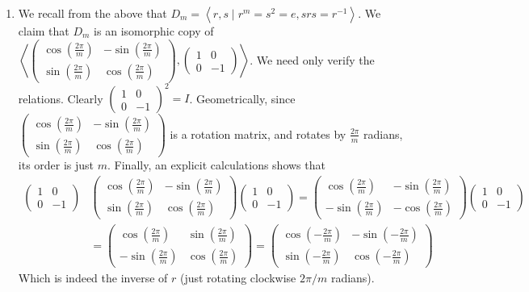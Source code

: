 \documentclass[12pt]{article}
\theoremstyle{definitionstyle}
\newcommand{\gen}[1]{\left\langle #1 \right\rangle}
\begin{document}
\begin{enumerate}[leftmargin=\labelsep]
\begin{enumerate}
			\item We recall from the above that $D_m = \gen{r, s \mid r^m = s^2 = e, srs = r^{-1}}$. We claim that $D_m$ is an isomorphic copy of $\gen{\begin{pmatrix}
					\cos(\frac{2\pi}{m}) & -\sin(\frac{2\pi}m) \\
					\sin(\frac{2\pi}{m}) & \cos(\frac{2\pi}m)
					\end{pmatrix}, \begin{pmatrix}
					1 & 0 \\
					0 & -1
					\end{pmatrix}}$. We need only verify the relations. Clearly $\begin{pmatrix} 1 & 0 \\ 0 & -1 \end{pmatrix}^2 = I$. Geometrically, since $\begin{pmatrix} \cos(\frac{2\pi}{m}) & -\sin(\frac{2\pi}m) \\ \sin(\frac{2\pi}{m}) & \cos(\frac{2\pi}m) \end{pmatrix}$ is a rotation matrix, and rotates by $\frac{2\pi}m$ radians, its order is just $m$. Finally, an explicit calculations shows that
					\begin{align*}
						\begin{pmatrix} 1 & 0 \\ 0 & -1 \end{pmatrix} & \begin{pmatrix} \cos(\frac{2\pi}{m}) & -\sin(\frac{2\pi}m) \\ \sin(\frac{2\pi}{m}) & \cos(\frac{2\pi}m) \end{pmatrix} \begin{pmatrix} 1 & 0 \\ 0 & -1 \end{pmatrix} = \begin{pmatrix} \cos(\frac{2\pi}{m}) & -\sin(\frac{2\pi}m) \\ -\sin(\frac{2\pi}{m}) & -\cos(\frac{2\pi}m) \end{pmatrix} \begin{pmatrix} 1 & 0 \\ 0 & -1 \end{pmatrix} \\ 
						&= \begin{pmatrix} \cos(\frac{2\pi}{m}) & \sin(\frac{2\pi}m) \\ -\sin(\frac{2\pi}{m}) & \cos(\frac{2\pi}m) \end{pmatrix} = \begin{pmatrix} \cos(-\frac{2\pi}{m}) & -\sin(-\frac{2\pi}m) \\ \sin(-\frac{2\pi}{m}) & \cos(-\frac{2\pi}m) \end{pmatrix}
					\end{align*}
					Which is indeed the inverse of $r$ (just rotating clockwise $2\pi/m$ radians).
		\end{enumerate}
	

\end{enumerate}
\end{document}
